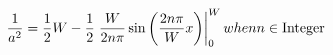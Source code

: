 \begin{equation}
\frac{1}{a^2}= \frac{1}{2}W - \frac{1}{2}\left. \frac{W}{2n\pi}\sin\left(\frac{2n\pi}{W} x\right)\right|_0^W    when{n \in {\rm Integer}}
\end{equation}